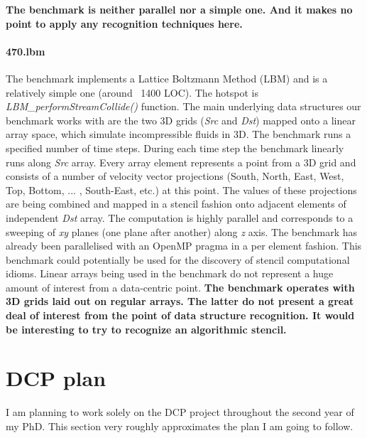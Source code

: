 \documentclass[10pt,a4paper]{report}
\begin{document}
\quad\textbf{The benchmark is neither parallel nor a simple one. And it makes no point to apply any recognition techniques here.}

\paragraph{470.lbm} The benchmark implements a Lattice Boltzmann Method (LBM) and is a relatively simple one (around ~1400 LOC). The hotspot is \textit{LBM\_performStreamCollide()} function. The main underlying data structures our benchmark works with are the two 3D grids (\textit{Src} and \textit{Dst}) mapped onto a linear array space, which simulate incompressible fluids in 3D. The benchmark runs a specified number of time steps. During each time step the benchmark linearly runs along \textit{Src} array. Every array element represents a point from a 3D grid and consists of a number of velocity vector projections (South, North, East, West, Top, Bottom,  ... , South-East, etc.) at this point. The values of these projections are being combined and mapped in a stencil fashion onto adjacent elements of independent \textit{Dst} array. The computation is highly parallel and corresponds to a sweeping of \textit{xy} planes (one plane after another) along \textit{z} axis. The benchmark has already been parallelised with an OpenMP pragma in a per element fashion. This benchmark could potentially be used for the discovery of stencil computational idioms. Linear arrays being used in the benchmark do not represent a huge amount of interest from a data-centric point.\newline\null
\quad\textbf{The benchmark operates with 3D grids laid out on regular arrays. The latter do not present a great deal of interest from the point of data structure recognition. It would be interesting to try to recognize an algorithmic stencil.}

\section{DCP plan}
\quad I am planning to work solely on the DCP project throughout the second year of my PhD. This section very roughly approximates the plan I am going to follow.
\end{document}
